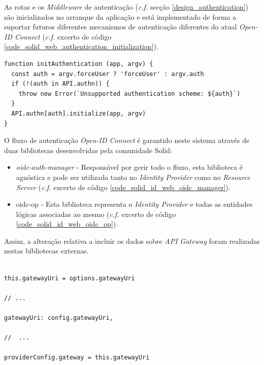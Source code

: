 As rotas e os \emph{Middleware} de autenticação (\emph{c.f.} secção \ref{design_authentication}) são inicializados no arranque da aplicação e está implementado de forma a suportar futuros diferentes mecanismos de autenticação diferentes do atual \emph{Open-ID Connect} (\emph{c.f.} excerto de código \ref{code_solid_web_authentication_initialization}).

\begin{lstlisting}[caption={Inicialização da autenticação no arranque}, label={code_solid_web_authentication_initialization}]
function initAuthentication (app, argv) {
  const auth = argv.forceUser ? 'forceUser' : argv.auth
  if (!(auth in API.authn)) {
    throw new Error(`Unsupported authentication scheme: ${auth}`)
  }
  API.authn[auth].initialize(app, argv)
}
\end{lstlisting}

O fluxo de autenticação \emph{Open-ID Connect} é garantido neste sistema através de duas bibliotecas desenvolvidas pela comunidade Solid:
\begin{itemize}
    \item \emph{oidc-auth-manager} - Responsável por gerir todo o fluxo, esta biblioteca é agnóstica e pode ser utilizada tanto no \emph{Identity Provider} como no \emph{Resource Server} (\emph{c.f.} excerto de código \ref{code_solid_id_web_oidc_manager}).
    \item oidc-op - Esta biblioteca representa o \emph{Identity Provider} e todas as entidades lógicas associadas ao mesmo (\emph{c.f.} excerto de código \ref{code_solid_id_web_oidc_op}).
\end{itemize}

Assim, a alteração relativa a incluir os dados sobre \emph{API Gateway} foram realizadas nestas bibliotecas externas.

\newpara
\newpara

\begin{lstlisting}[caption={Alteração ao \emph{OIDCManager} na biblioteca nativa do \emph{Solid} \emph{oidc-auth-manager}}, label={code_solid_id_web_oidc_manager}]

this.gatewayUri = options.gatewayUri

// ...

gatewayUri: config.gatewayUri,

//  ...

providerConfig.gateway = this.gatewayUri

\end{lstlisting}

